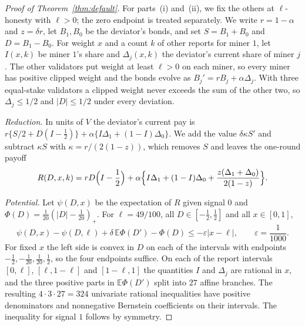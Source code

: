\documentclass[sigconf,anonymous,review]{acmart}
\numberwithin{equation}{section}
\newcommand{\E}{\mathbb{E}}
\begin{document}
\begin{proof}[Proof of Theorem~\ref{thm:default}]
For parts~(i) and~(ii), we fix the others at $\ell$-honesty with $\ell>0$;
the zero endpoint is treated separately. We write $r=1-\alpha$ and
$z=\delta r$, let $B_1,B_0$ be the deviator's
bonds, and set $S=B_1+B_0$ and $D=B_1-B_0$. For weight $x$ and a count $k$ of
other reports for miner $1$, let $I(x,k)$ be miner $1$'s share and
$\Delta_j(x,k)$ the deviator's current share of miner $j$. The other validators
put weight at least $\ell>0$ on each miner, so every miner has positive clipped
weight and the bonds evolve as $B_j'=rB_j+\alpha\Delta_j$. With three
equal-stake validators a clipped weight never exceeds the sum of the other two,
so $\Delta_j\le1/2$ and $|D|\le1/2$ under every deviation.

\emph{Reduction.} In units of $V$ the deviator's current pay is
$r\{S/2+D(I-\frac12)\}+\alpha\{I\Delta_1+(1-I)\Delta_0\}$. We add the value
$\delta\kappa S'$ and subtract $\kappa S$ with $\kappa=r/(2(1-z))$, which removes
$S$ and leaves the one-round payoff
\begin{equation}\label{eq:reduced}
R(D,x,k)=rD\Bigl(I-\frac12\Bigr)+\alpha\Bigl\{I\Delta_1+(1-I)\Delta_0+\frac{z(\Delta_1+\Delta_0)}{2(1-z)}\Bigr\}.
\end{equation}

\emph{Potential.} Let $\psi(D,x)$ be the expectation of $R$ given signal $0$
and $\Phi(D)=\frac1{20}(|D|-\frac1{20})_+$. For $\ell=49/100$, all
$D\in[-\frac12,\frac12]$ and all $x\in[0,1]$,
\begin{equation}\label{eq:potential}
\psi(D,x)-\psi(D,\ell)+\delta\,\E\Phi(D')-\Phi(D)\le-\varepsilon|x-\ell|,\qquad \varepsilon=\frac1{1000}.
\end{equation}
For fixed $x$ the left side is convex in $D$ on each of the intervals with
endpoints $-\frac12,-\frac1{20},\frac1{20},\frac12$, so the four endpoints
suffice. On each of the report intervals $[0,\ell]$, $[\ell,1-\ell]$ and
$[1-\ell,1]$ the quantities $I$ and $\Delta_j$ are rational in $x$, and the
three positive parts in $\E\Phi(D')$ split into $27$ affine branches. The
resulting $4\cdot3\cdot27=324$ univariate rational inequalities have positive
denominators and nonnegative Bernstein coefficients on their intervals. The
inequality for signal $1$ follows by symmetry.


\end{proof}
\end{document}
